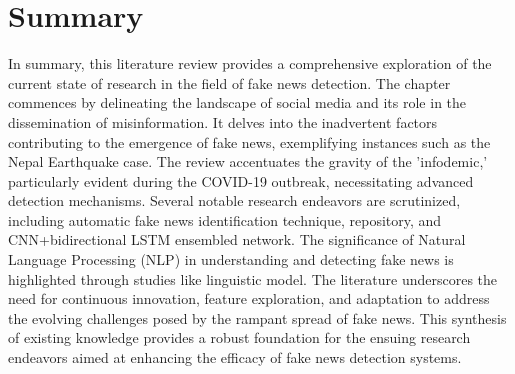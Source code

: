 \section{Summary} 
In summary, this literature review provides a comprehensive exploration of the current state of 
research in the field of fake news detection. The chapter commences by delineating the 
landscape of social media and its role in the dissemination of misinformation. It delves into 
the inadvertent factors contributing to the emergence of fake news, exemplifying instances such 
as the Nepal Earthquake case. The review accentuates the gravity of the 'infodemic,' 
particularly evident during the COVID-19 outbreak, necessitating advanced detection mechanisms. 
Several notable research endeavors are scrutinized, including \cite{sahoo2021multiple} automatic fake 
news identification technique, \cite{shu2020fakenewsnet} repository, and \cite{Kumar}
CNN+bidirectional LSTM ensembled network. The significance of Natural Language Processing (NLP) 
in understanding and detecting fake news is highlighted through studies like \cite{choudhary2021linguistic} 
linguistic model. The literature underscores the need for continuous innovation, feature 
exploration, and adaptation to address the evolving challenges posed by the rampant spread of 
fake news. This synthesis of existing knowledge provides a robust foundation for the ensuing 
research endeavors aimed at enhancing the efficacy of fake news detection systems.~\\
